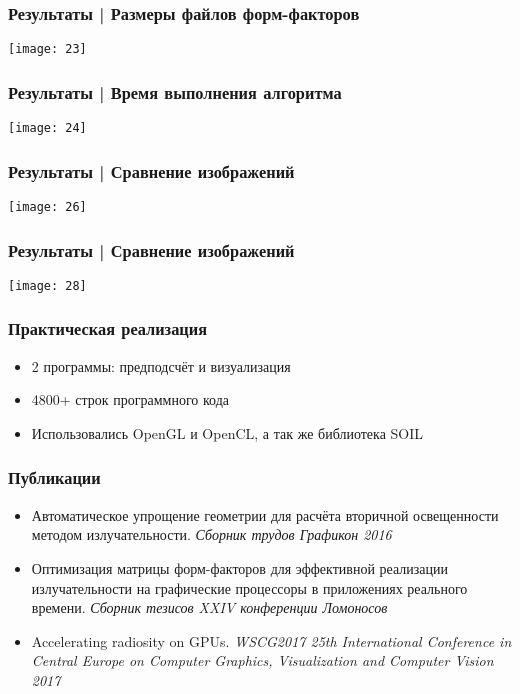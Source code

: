 \documentclass[unicode, dvipsnames]{beamer}
\begin{document}
\begin{frame}
	\frametitle{Результаты | Размеры файлов форм-факторов}
	\texttt{[image: 23]}
\end{frame}

\begin{frame}
	\frametitle{Результаты | Время выполнения алгоритма}
	\texttt{[image: 24]}
\end{frame}

\begin{frame}
	\frametitle{Результаты | Сравнение изображений}
	\center
	\texttt{[image: 26]}
\end{frame}

\begin{frame}
	\frametitle{Результаты | Сравнение изображений}
	\center
	\texttt{[image: 28]}
\end{frame}

\begin{frame}
	\frametitle{Практическая реализация}

	\begin{itemize}
		\item 2 программы: предподсчёт и визуализация
		\item 4800+ строк программного кода
		\item Использовались OpenGL и OpenCL, а так же библиотека SOIL
	\end{itemize}
\end{frame}

\begin{frame}
	\frametitle{Публикации}
	
	\begin{itemize}
		\item Автоматическое упрощение геометрии для расчёта вторичной освещенности методом излучательности. 
		\textit{Сборник трудов Графикон 2016}
		\item Оптимизация матрицы форм-факторов для эффективной реализации излучательности на графические процессоры в приложениях реального времени.
		\textit{Сборник тезисов XXIV конференции Ломоносов}
		\item Accelerating radiosity on GPUs. 
		\textit{WSCG2017 25th International Conference in Central Europe on Computer Graphics, Visualization and Computer Vision 2017}
	\end{itemize}
\end{frame}
\end{document}
